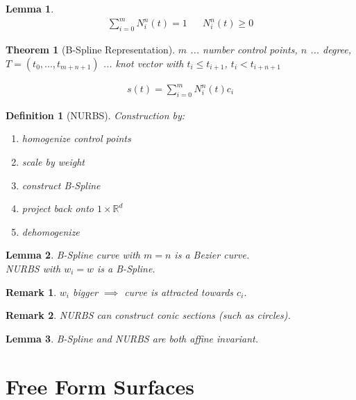 \documentclass[conference]{IEEEtran}
\newtheorem{definition}{Definition}
\newtheorem{lemma}{Lemma}
\newtheorem{theorem}{Theorem}
\newtheorem{remark}{Remark}
\begin{document}
\begin{lemma}
	\begin{align*}
		\sum_{i=0}^{m} N_i^n(t) = 1 && N_i^n(t) \geq 0
	\end{align*}
\end{lemma}

\begin{theorem}[B-Spline Representation]
	$m$ ... number control points, $n$ ... degree, $T=(t_0, ..., t_{m+n+1})$ ... knot vector with $t_i \leq t_{i+1}$, $t_i < t_{i+n+1}$
	
	\begin{align*}
		s(t) = \sum_{i=0}^{m} N_i^n(t) c_i
	\end{align*}
\end{theorem}

\begin{definition}[NURBS]
	Construction by:\\
	\begin{enumerate}
		\item homogenize control points
		\item scale by weight
		\item construct B-Spline
		\item project back onto $1\times\mathbb{R}^d$
		\item dehomogenize
	\end{enumerate}
\end{definition}

\begin{lemma}
	B-Spline curve with $m=n$ is a Bezier curve.\\
	NURBS with $w_i = w$ is a B-Spline.
\end{lemma}

\begin{remark}
	$w_i$ bigger $\implies$ curve is attracted towards $c_i$.
\end{remark}

\begin{remark}
	NURBS can construct conic sections (such as circles).
\end{remark}

\begin{lemma}
	B-Spline and NURBS are both affine invariant.
\end{lemma}

\section{Free Form Surfaces}
\end{document}
